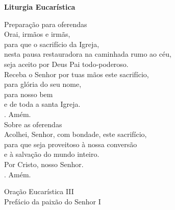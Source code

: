 \documentclass{book}
\begin{document}
\begin{center}
    \textbf{Liturgia Eucarística}
\end{center}
\begin{flushleft}
    \textcolor{VioletRed2}{Preparação para oferendas}
    \vspace{.2cm} \\
    Orai, irmãos e irmãs, \\
    para que o sacrifício da Igreja, \\
    nesta pausa restauradora na caminhada rumo ao céu, \\
    seja aceito por Deus Pai todo-poderoso.
    \vspace{.2cm} \\
    Receba o Senhor por tuas mãos este sacrifício, \\
    para glória do seu nome, \\
    para nosso bem \\
    e de toda a santa Igreja.
    \vspace{.2cm} \\
    {\color{VioletRed2} \Rbar.} Amém.
    \vspace{.2cm} \\
    \textcolor{VioletRed2}{Sobre as oferendas}
    \vspace{.2cm} \\
    Acolhei, Senhor, com bondade, este sacrifício, \\
    para que seja proveitoso à nossa conversão \\
    e à salvação do mundo inteiro. \\
    Por Cristo, nosso Senhor. \\
    {\color{VioletRed2} \Rbar.} Amém.
\end{flushleft}
\begin{center}
    \textcolor{VioletRed2}{Oração Eucarística III \\ \small Prefácio da paixão do Senhor I}
\end{center}
\end{document}
